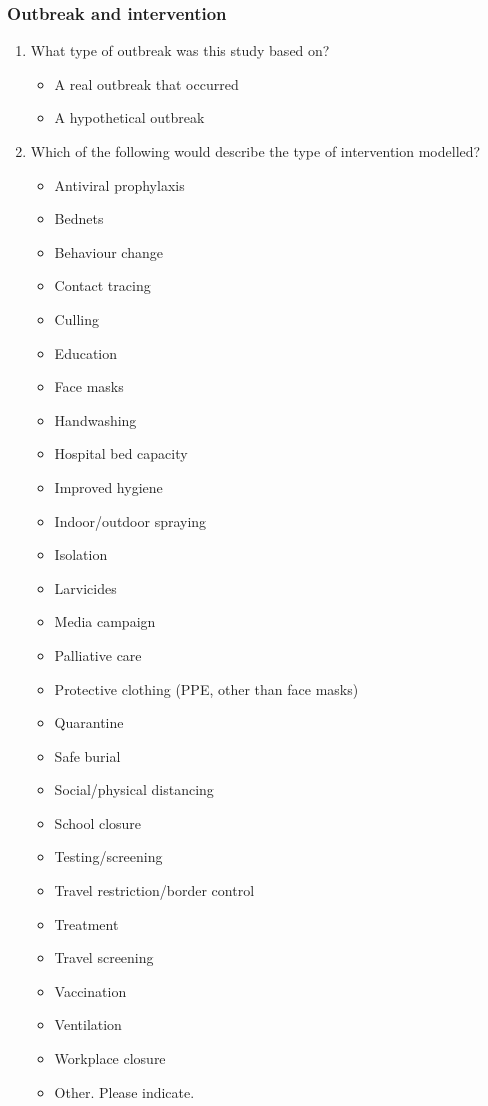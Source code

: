 \documentclass[10pt,a4paper]{article}
\begin{document}
	\subsubsection{Outbreak and intervention }
	\begin{enumerate}[resume]
		\item What type of outbreak was this study based on? 
		\begin{itemize}
			\item A real outbreak that occurred 
			\item A hypothetical outbreak
		\end{itemize}
		\item Which of the following would describe the type of intervention modelled? 
		\begin{multicols}{2}
			\begin{itemize}
				\item Antiviral prophylaxis
				\item Bednets
				\item Behaviour change
				\item Contact tracing
				\item Culling
				\item Education
				\item Face masks
				\item Handwashing
				\item Hospital bed capacity
				\item Improved hygiene
				\item Indoor/outdoor spraying
				\item Isolation
				\item Larvicides
				\item Media campaign
				\item Palliative care
				\item Protective clothing (PPE, other than face masks)
				\item Quarantine
				\item Safe burial
				\item Social/physical distancing
				\item School closure
				\item Testing/screening
				\item Travel restriction/border control
				\item Treatment
				\item Travel screening
				\item Vaccination
				\item Ventilation
				\item Workplace closure
				\item 	Other. Please indicate.
			\end{itemize}
		\end{multicols}
	\end{enumerate}
	
\end{document}
